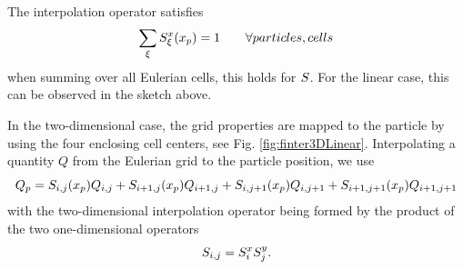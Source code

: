 The interpolation operator satisfies
\begin{equation*}
    \sum_{\xi} S_\xi^{x} (x_p) =1 \qquad \forall particles, cells
\end{equation*}
when summing over all Eulerian cells, this holds for $S$.
For the linear case, this can be observed in the sketch above.

In the two-dimensional case, the grid properties are mapped to the particle by using the four enclosing cell centers, see Fig. \ref{fig:finter3DLinear}. 
Interpolating a quantity $Q$ from the Eulerian grid to the particle position, we use
\begin{equation*}
    Q_p = S_{i,j} (x_p) Q_{i,j} + S_{i+1,j} (x_p) Q_{i+1,j}+ S_{i,j+1} (x_p) Q_{i,j+1}+ S_{i+1,j+1} (x_p) Q_{i+1,j+1}
\end{equation*}
with the two-dimensional interpolation operator being formed by the product of the two one-dimensional operators
\begin{equation*}
    S_{i,j} = S_i^{x} S_j^y.
\end{equation*}


